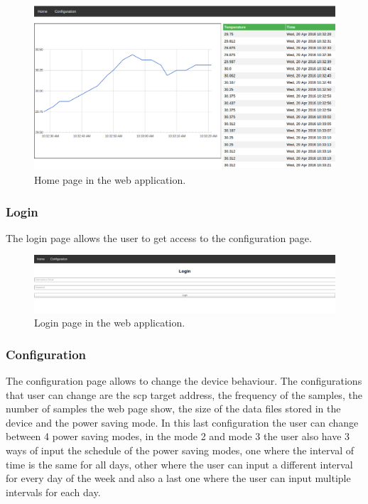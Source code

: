 		\begin{figure}[h!]
		\includegraphics[width=12cm]{fig/homepage.png}
		\centering
		\caption{Home page in the web application.\label{fig:homepage}}
		\end{figure}
		
		\subsubsection{Login}
		The login page allows the user to get access to the configuration page.

		\begin{figure}[h!]
		\includegraphics[width=12cm]{fig/loginpage.png}
		\centering
		\caption{Login page in the web application.\label{fig:loginpage}}
		\end{figure}

		\subsubsection{Configuration} %
		The configuration page allows to change the device behaviour. The configurations that user can change are the scp target address, the frequency of the samples, the number of samples the web page show, the size of the data files stored in the device and the power saving mode. In this last configuration the user can change between 4 power saving modes, in the mode 2 and mode 3 the user also have 3 ways of input the schedule of the power saving modes, one where the interval of time is the same for all days, other where the user can input a different interval for every day of the week and also a last one where the user can input multiple intervals for each day.


